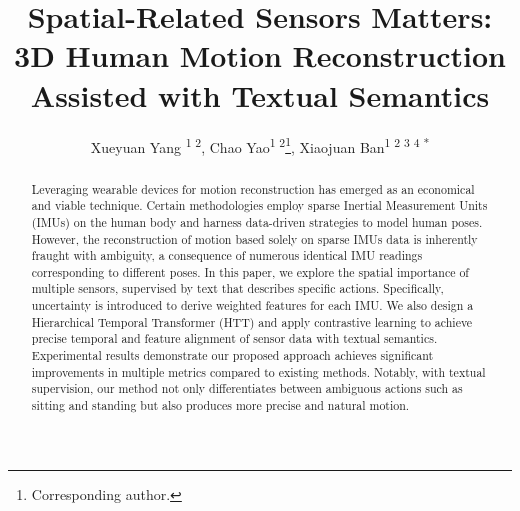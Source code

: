 \documentclass[letterpaper]{article} %
\title{Spatial-Related Sensors Matters: 3D Human Motion Reconstruction Assisted with Textual Semantics}
\author{
    Xueyuan Yang \textsuperscript{\rm 1 2},
    Chao Yao\textsuperscript{\rm 1 2}\thanks{Corresponding author.},
    Xiaojuan Ban\textsuperscript{\rm 1 2 3 4 *}
}
\begin{document}
\maketitle


\begin{abstract}
Leveraging wearable devices for motion reconstruction has emerged as an economical and viable technique. Certain methodologies employ sparse Inertial Measurement Units (IMUs) on the human body and harness data-driven strategies to model human poses.
However, the reconstruction of motion based solely on sparse IMUs data is inherently fraught with ambiguity, a consequence of numerous identical IMU readings corresponding to different poses. 
In this paper, we explore the spatial importance of multiple sensors, supervised by text that describes specific actions. Specifically, uncertainty is introduced to derive weighted features for each IMU. We also design a Hierarchical Temporal Transformer (HTT) and apply contrastive learning to achieve precise temporal and feature alignment of sensor data with textual semantics.
Experimental results demonstrate our proposed approach achieves significant improvements in multiple metrics compared to existing methods. Notably, with textual supervision, our method not only differentiates between ambiguous actions such as sitting and standing but also produces more precise and natural motion.
\end{abstract}
\end{document}
